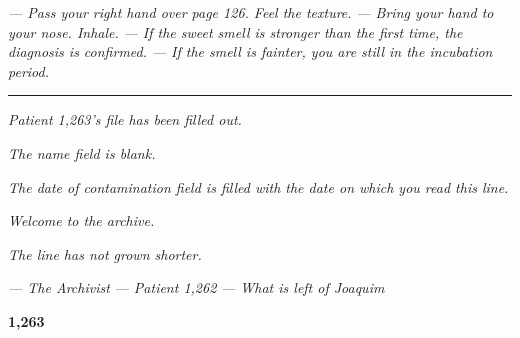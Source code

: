 \documentclass[14pt,openany]{extbook}
\begin{document}
\begin{center}
\vspace{0.5em}

\noindent\textit{--- Pass your right hand over page 126. Feel the texture.}
\noindent\textit{--- Bring your hand to your nose. Inhale.}
\noindent\textit{--- If the sweet smell is stronger than the first time, the diagnosis is confirmed.}
\noindent\textit{--- If the smell is fainter, you are still in the incubation period.}

\vspace{1.5em}

\noindent\textcolor{sangue}{\rule{0.15\textwidth}{0.5pt}}

\vspace{1.5em}

\noindent\textit{Patient 1,263's file has been filled out.}

\noindent\textit{The \textquotedbl{}name\textquotedbl{} field is blank.}

\noindent\textit{The \textquotedbl{}date of contamination\textquotedbl{} field is filled with the date on which you read this line.}

\noindent\textit{Welcome to the archive.}

\noindent\textit{The line has not grown shorter.}

\vspace{1.5em}

\noindent\textit{--- The Archivist}
\vspace{0.3em}
\noindent\textit{--- Patient 1,262}
\vspace{0.3em}
\noindent\textit{--- What is left of Joaquim}

\vspace{2em}
\textcolor{olho}{\large \textbf{1,263}}

\end{center}
\vfill



\backmatter




\end{document}
